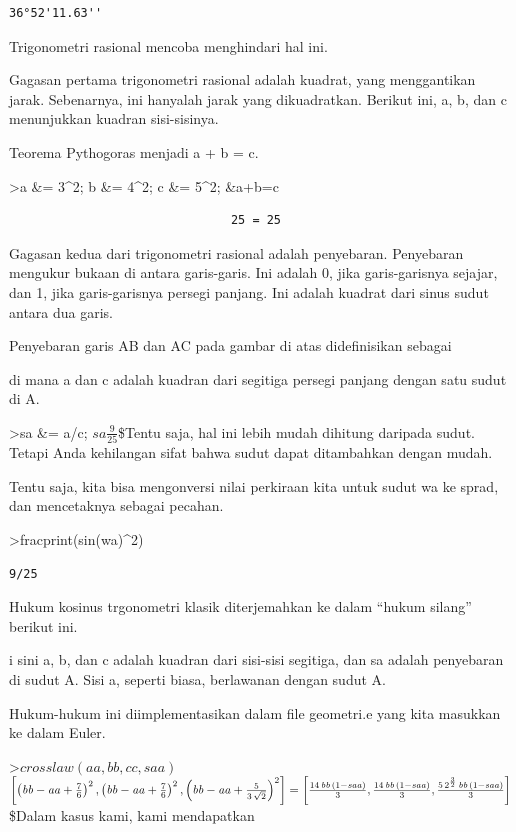 \documentclass[
]{book}
\begin{document}
\begin{verbatim}
36°52'11.63''
\end{verbatim}

Trigonometri rasional mencoba menghindari hal ini.

Gagasan pertama trigonometri rasional adalah kuadrat, yang menggantikan jarak. Sebenarnya, ini hanyalah jarak yang dikuadratkan. Berikut ini, a, b, dan c menunjukkan kuadran sisi-sisinya.

Teorema Pythogoras menjadi a + b = c.

\textgreater a \&= 3\^{}2; b \&= 4\^{}2; c \&= 5\^{}2; \&a+b=c

\begin{verbatim}
                               25 = 25
\end{verbatim}

Gagasan kedua dari trigonometri rasional adalah penyebaran. Penyebaran mengukur bukaan di antara garis-garis. Ini adalah 0, jika garis-garisnya sejajar, dan 1, jika garis-garisnya persegi panjang. Ini adalah kuadrat dari sinus sudut antara dua garis.

Penyebaran garis AB dan AC pada gambar di atas didefinisikan sebagai

di mana a dan c adalah kuadran dari segitiga persegi panjang dengan satu sudut di A.

\textgreater sa \&= a/c; \(sa\)\(\frac{9}{25}\)\$Tentu saja, hal ini lebih mudah dihitung daripada sudut. Tetapi Anda kehilangan sifat bahwa sudut dapat ditambahkan dengan mudah.

Tentu saja, kita bisa mengonversi nilai perkiraan kita untuk sudut wa ke sprad, dan mencetaknya sebagai pecahan.

\textgreater fracprint(sin(wa)\^{}2)

\begin{verbatim}
9/25
\end{verbatim}

Hukum kosinus trgonometri klasik diterjemahkan ke dalam ``hukum silang'' berikut ini.

i sini a, b, dan c adalah kuadran dari sisi-sisi segitiga, dan sa adalah penyebaran di sudut A. Sisi a, seperti biasa, berlawanan dengan sudut A.

Hukum-hukum ini diimplementasikan dalam file geometri.e yang kita masukkan ke dalam Euler.

\textgreater{}\(crosslaw(aa,bb,cc,saa)\)\(\left[ \left({\it bb}-{\it aa}+\frac{7}{6}\right)^2 , \left(  {\it bb}-{\it aa}+\frac{7}{6}\right)^2 , \left({\it bb}-{\it aa}+  \frac{5}{3\,\sqrt{2}}\right)^2 \right] =\left[ \frac{14\,{\it bb}\,  \left(1-{\it saa}\right)}{3} , \frac{14\,{\it bb}\,\left(1-{\it saa}  \right)}{3} , \frac{5\,2^{\frac{3}{2}}\,{\it bb}\,\left(1-{\it saa}  \right)}{3} \right]\)\$Dalam kasus kami, kami mendapatkan
\end{document}
